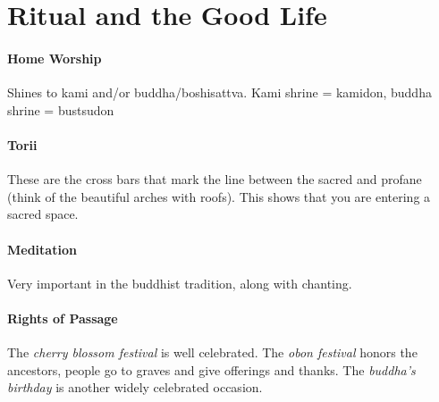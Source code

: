\documentclass{article}
\begin{document}
\section*{Ritual and the Good Life}
\label{sec:ritual_and_the_good_life}
\paragraph{Home Worship}
\label{par:home_worship}
Shines to kami and/or buddha/boshisattva. Kami shrine = kamidon, buddha shrine = bustsudon

\paragraph{Torii}
\label{par:torii}
These are the cross bars that mark the line between the sacred and profane (think of the beautiful arches with roofs). This shows that you are entering a sacred space.

\paragraph{Meditation}
\label{par:meditation}
Very important in the buddhist tradition, along with chanting.

\paragraph{Rights of Passage}
\label{par:rights_of_passage}
The \emph{cherry blossom festival} is well celebrated. The \emph{obon festival} honors the ancestors, people go to graves and give offerings and thanks. The \emph{buddha's birthday} is another widely celebrated occasion.
\end{document}
